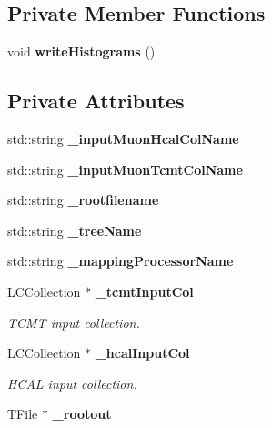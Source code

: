 \subsection*{Private Member Functions}
\begin{DoxyCompactItemize}
\item 
void {\bfseries write\-Histograms} ()\label{classCellAnalysisProcessor_a25f161fbb939b83c8b6d257716cffe03}

\end{DoxyCompactItemize}
\subsection*{Private Attributes}
\begin{DoxyCompactItemize}
\item 
std\-::string {\bfseries \-\_\-input\-Muon\-Hcal\-Col\-Name}\label{classCellAnalysisProcessor_a192ef14533dd5e962c6b58f56393ed76}

\item 
std\-::string {\bfseries \-\_\-input\-Muon\-Tcmt\-Col\-Name}\label{classCellAnalysisProcessor_ae0e2834703e39e3fa9aab2007d56440e}

\item 
std\-::string {\bfseries \-\_\-rootfilename}\label{classCellAnalysisProcessor_a7cdb93f7abacb1ada4ad4ed421493e0b}

\item 
std\-::string {\bfseries \-\_\-tree\-Name}\label{classCellAnalysisProcessor_a587be2086799cd234637c08946a7499b}

\item 
std\-::string {\bfseries \-\_\-mapping\-Processor\-Name}\label{classCellAnalysisProcessor_a913b95ba8bbe5eccf8253928b50a16fe}

\item 
L\-C\-Collection $\ast$ {\bf \-\_\-tcmt\-Input\-Col}\label{classCellAnalysisProcessor_aca9af286c2a95ce17648ea2ecefed3ef}

\begin{DoxyCompactList}\small\item\em T\-C\-M\-T input collection. \end{DoxyCompactList}\item 
L\-C\-Collection $\ast$ {\bf \-\_\-hcal\-Input\-Col}\label{classCellAnalysisProcessor_a2fb10b5b1cc09ca4608868c5658279e7}

\begin{DoxyCompactList}\small\item\em H\-C\-A\-L input collection. \end{DoxyCompactList}\item 
T\-File $\ast$ {\bfseries \-\_\-rootout}\label{classCellAnalysisProcessor_a63dad02fbdf1a06166effdd1b09ba0bf}


\end{DoxyCompactItemize}
